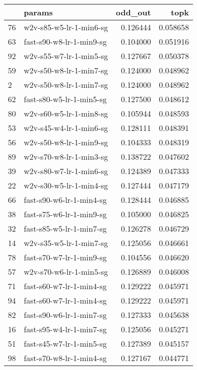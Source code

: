 \begin{tabular}{llrr}
\toprule
{} &                       params &   odd\_out &      topk \\
\midrule
76 &      w2v-s85-w5-lr-1-min6-sg &  0.126444 &  0.058658 \\
63 &     fast-s90-w8-lr-1-min9-sg &  0.104000 &  0.051916 \\
92 &      w2v-s55-w7-lr-1-min5-sg &  0.127667 &  0.050378 \\
59 &      w2v-s50-w8-lr-1-min7-sg &  0.124000 &  0.048962 \\
2  &      w2v-s50-w8-lr-1-min7-sg &  0.124000 &  0.048962 \\
62 &     fast-s80-w5-lr-1-min5-sg &  0.127500 &  0.048612 \\
80 &      w2v-s60-w5-lr-1-min8-sg &  0.105944 &  0.048593 \\
53 &      w2v-s45-w4-lr-1-min6-sg &  0.128111 &  0.048391 \\
56 &      w2v-s50-w8-lr-1-min9-sg &  0.104333 &  0.048319 \\
89 &      w2v-s70-w8-lr-1-min3-sg &  0.138722 &  0.047602 \\
39 &      w2v-s80-w7-lr-1-min6-sg &  0.124389 &  0.047333 \\
22 &      w2v-s30-w5-lr-1-min4-sg &  0.127444 &  0.047179 \\
66 &     fast-s90-w6-lr-1-min4-sg &  0.128444 &  0.046885 \\
38 &     fast-s75-w6-lr-1-min9-sg &  0.105000 &  0.046825 \\
32 &     fast-s85-w5-lr-1-min7-sg &  0.126278 &  0.046729 \\
14 &      w2v-s35-w5-lr-1-min7-sg &  0.125056 &  0.046661 \\
78 &     fast-s70-w7-lr-1-min9-sg &  0.104556 &  0.046620 \\
57 &      w2v-s70-w6-lr-1-min5-sg &  0.126889 &  0.046008 \\
71 &     fast-s60-w7-lr-1-min4-sg &  0.129222 &  0.045971 \\
94 &     fast-s60-w7-lr-1-min4-sg &  0.129222 &  0.045971 \\
82 &     fast-s90-w6-lr-1-min7-sg &  0.127333 &  0.045638 \\
16 &     fast-s95-w4-lr-1-min7-sg &  0.125056 &  0.045271 \\
51 &     fast-s45-w7-lr-1-min5-sg &  0.127389 &  0.045157 \\
98 &     fast-s70-w8-lr-1-min4-sg &  0.127167 &  0.044771 \\

\end{tabular}
